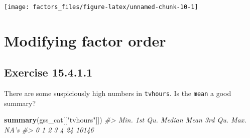 \documentclass[]{book}
\newenvironment{Shaded}{\begin{snugshade}}{\end{snugshade}}
\newcommand{\CommentTok}[1]{\textcolor[rgb]{0.56,0.35,0.01}{\textit{#1}}}
\newcommand{\DataTypeTok}[1]{\textcolor[rgb]{0.13,0.29,0.53}{#1}}
\newcommand{\DecValTok}[1]{\textcolor[rgb]{0.00,0.00,0.81}{#1}}
\newcommand{\KeywordTok}[1]{\textcolor[rgb]{0.13,0.29,0.53}{\textbf{#1}}}
\newcommand{\NormalTok}[1]{#1}
\newcommand{\OperatorTok}[1]{\textcolor[rgb]{0.81,0.36,0.00}{\textbf{#1}}}
\newcommand{\StringTok}[1]{\textcolor[rgb]{0.31,0.60,0.02}{#1}}
\theoremstyle{plain}
\theoremstyle{remark}
\begin{document}
\begin{Shaded}
\end{Shaded}

\begin{center}\texttt{[image: factors\_files/figure-latex/unnamed-chunk-10-1]} \end{center}

\hypertarget{modifying-factor-order}{%
\section{Modifying factor order}\label{modifying-factor-order}}

\hypertarget{exercise-15.4.1.1}{%
\subsection*{\texorpdfstring{Exercise
{15.4.1.1}}{Exercise 15.4.1.1}}\label{exercise-15.4.1.1}}

There are some suspiciously high numbers in \texttt{tvhours}. Is the
\texttt{mean} a good summary?

\begin{Shaded}
\begin{Highlighting}[]
\KeywordTok{summary}\NormalTok{(gss_cat[[}\StringTok{"tvhours"}\NormalTok{]])}
\CommentTok{#>    Min. 1st Qu.  Median    Mean 3rd Qu.    Max.    NA's }
\CommentTok{#>       0       1       2       3       4      24   10146}
\end{Highlighting}
\end{Shaded}

\begin{Shaded}
\end{Shaded}
\end{document}

